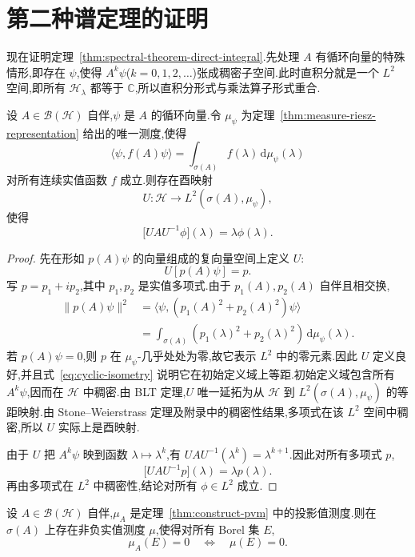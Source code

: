 \section{第二种谱定理的证明}
\label{sec:proof-spectral-second}

现在证明定理~\ref{thm:spectral-theorem-direct-integral}.先处理 \(A\) 有循环向量的特殊情形,即存在 \(\psi\),使得 \(A^{k}\psi\)(\(k=0,1,2,\ldots\))张成稠密子空间.此时直积分就是一个 \(L^{2}\) 空间,即所有 \(\mathcal{H}_{\lambda}\) 都等于 \(\mathbb{C}\),所以直积分形式与乘法算子形式重合.

\begin{lemma}[循环向量情形]\label{lem:cyclic-spectral-representation}
设 \(A\in\mathcal{B}(\mathcal{H})\) 自伴,\(\psi\) 是 \(A\) 的循环向量.令 \(\mu_{\psi}\) 为定理~\ref{thm:measure-riesz-representation} 给出的唯一测度,使得
\[
\langle\psi,f(A)\psi\rangle
=\int_{\sigma(A)}f(\lambda)\,\mathrm{d}\mu_{\psi}(\lambda)
\]
对所有连续实值函数 \(f\) 成立.则存在酉映射
\[
U:\mathcal{H}\to L^{2}(\sigma(A),\mu_{\psi}),
\]
使得
\[
\bigl[UAU^{-1}\phi\bigr](\lambda)=\lambda\phi(\lambda).
\]
\end{lemma}

\begin{proof}
先在形如 \(p(A)\psi\) 的向量组成的复向量空间上定义 \(U\):
\[
U[p(A)\psi]=p.
\]
写 \(p=p_{1}+ip_{2}\),其中 \(p_{1},p_{2}\) 是实值多项式.由于 \(p_{1}(A),p_{2}(A)\) 自伴且相交换,
\[
\begin{aligned}
\|p(A)\psi\|^{2}
&=\langle\psi,(p_{1}(A)^{2}+p_{2}(A)^{2})\psi\rangle\\
&=\int_{\sigma(A)}(p_{1}(\lambda)^{2}+p_{2}(\lambda)^{2})\,\mathrm{d}\mu_{\psi}(\lambda).
\end{aligned}
\label{eq:cyclic-isometry}
\]
若 \(p(A)\psi=0\),则 \(p\) 在 \(\mu_{\psi}\)-几乎处处为零,故它表示 \(L^{2}\) 中的零元素.因此 \(U\) 定义良好,并且式~\eqref{eq:cyclic-isometry} 说明它在初始定义域上等距.初始定义域包含所有 \(A^{k}\psi\),因而在 \(\mathcal{H}\) 中稠密.由 BLT 定理,\(U\) 唯一延拓为从 \(\mathcal{H}\) 到 \(L^{2}(\sigma(A),\mu_{\psi})\) 的等距映射.由 Stone--Weierstrass 定理及附录中的稠密性结果,多项式在该 \(L^{2}\) 空间中稠密,所以 \(U\) 实际上是酉映射.

由于 \(U\) 把 \(A^{k}\psi\) 映到函数 \(\lambda\mapsto\lambda^{k}\),有 \(UAU^{-1}(\lambda^{k})=\lambda^{k+1}\).因此对所有多项式 \(p\),
\[
\bigl[UAU^{-1}p\bigr](\lambda)=\lambda p(\lambda).
\]
再由多项式在 \(L^{2}\) 中稠密性,结论对所有 \(\phi\in L^{2}\) 成立.
\end{proof}

\begin{lemma}[由投影值测度构造普通测度]\label{lem:pvm-dominating-measure}
设 \(A\in\mathcal{B}(\mathcal{H})\) 自伴,\(\mu_{A}\) 是定理~\ref{thm:construct-pvm} 中的投影值测度.则在 \(\sigma(A)\) 上存在非负实值测度 \(\mu\),使得对所有 Borel 集 \(E\),
\[
\mu_{A}(E)=0\quad\Longleftrightarrow\quad\mu(E)=0.
\]
\end{lemma}

